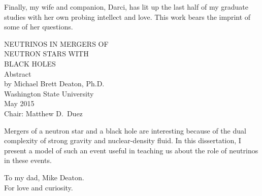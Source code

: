 \documentclass[12pt]{report}
\begin{document}
  Finally, my wife and companion, Darci, has lit up the last half of my graduate
  studies with her own probing intellect and love. This work bears the imprint
  of some of her questions.

\newpage

\begin{center}
  \begin{singlespace}
    \label{ssec:abstract}

    {\uppercase{
        Neutrinos in Mergers of\\
        Neutron Stars with\\
        Black Holes}}\\
    \bigskip
    Abstract\\
    \bigskip \bigskip \bigskip
    by Michael Brett Deaton, Ph.D.\\
    Washington State University\\
    May 2015\\
    \bigskip \bigskip \bigskip
    Chair: Matthew D.\ Duez
  \end{singlespace}
\end{center}
  
Mergers of a neutron star and a black hole are interesting because of the dual
complexity of strong gravity and nuclear-density fluid. In this dissertation,
I present a model of such an event useful in teaching us about the role of
neutrinos in these events.
\newpage

\tableofcontents
\newpage

\listoftables
{} %
\newpage

\listoffigures
{} %
\newpage

\begin{center}
  \null
  \vspace{2.7in}
  \bigskip
  To my dad, Mike Deaton.\\
  For love and curiosity.
  \newpage
\end{center}










\newpage

%  


\end{document}
